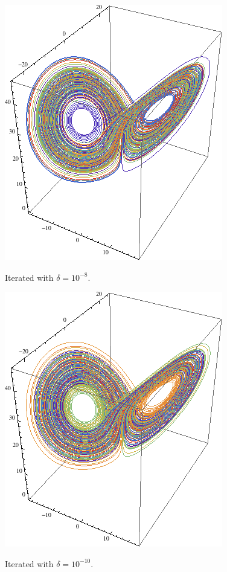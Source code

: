 \documentclass[letterpaper,10pt]{article}
\begin{document}
\begin{description}
\begin{center}
  \includegraphics[scale=0.5]{images/lorenz4.png}
\end{center}
Iterated with $\delta=10^{-8}$.
\begin{center}
  \includegraphics[scale=0.5]{images/lorenz5.png}
\end{center}
Iterated with $\delta=10^{-10}$.
\begin{center}

\end{center}
\end{description}
\end{document}
